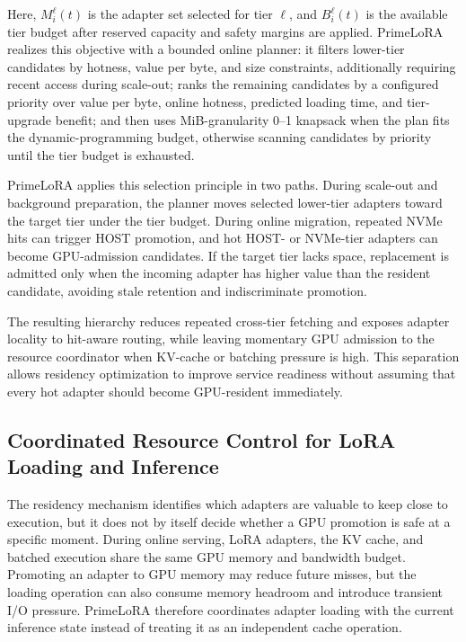 \documentclass[lettersize,journal]{IEEEtran}
\begin{document}
Here, $M_i^{\ell}(t)$ is the adapter set selected for tier $\ell$, and $B_i^{\ell}(t)$ is the available tier budget after reserved capacity and safety margins are applied. PrimeLoRA realizes this objective with a bounded online planner: it filters lower-tier candidates by hotness, value per byte, and size constraints, additionally requiring recent access during scale-out; ranks the remaining candidates by a configured priority over value per byte, online hotness, predicted loading time, and tier-upgrade benefit; and then uses MiB-granularity 0--1 knapsack when the plan fits the dynamic-programming budget, otherwise scanning candidates by priority until the tier budget is exhausted.

PrimeLoRA applies this selection principle in two paths. During scale-out and background preparation, the planner moves selected lower-tier adapters toward the target tier under the tier budget. During online migration, repeated NVMe hits can trigger HOST promotion, and hot HOST- or NVMe-tier adapters can become GPU-admission candidates. If the target tier lacks space, replacement is admitted only when the incoming adapter has higher value than the resident candidate, avoiding stale retention and indiscriminate promotion.

The resulting hierarchy reduces repeated cross-tier fetching and exposes adapter locality to hit-aware routing, while leaving momentary GPU admission to the resource coordinator when KV-cache or batching pressure is high. This separation allows residency optimization to improve service readiness without assuming that every hot adapter should become GPU-resident immediately.

\subsection{Coordinated Resource Control for LoRA Loading and Inference}

The residency mechanism identifies which adapters are valuable to keep close to execution, but it does not by itself decide whether a GPU promotion is safe at a specific moment. During online serving, LoRA adapters, the KV cache, and batched execution share the same GPU memory and bandwidth budget. Promoting an adapter to GPU memory may reduce future misses, but the loading operation can also consume memory headroom and introduce transient I/O pressure. PrimeLoRA therefore coordinates adapter loading with the current inference state instead of treating it as an independent cache operation.
\end{document}
